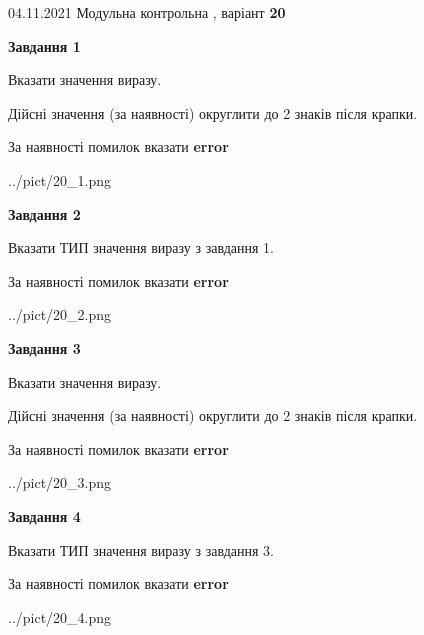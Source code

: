 \documentclass[11pt, ukrainian]{article}
\begin{document}
{04.11.2021 Модульна контрольна , варіант  \No \textbf { 20 }\par}
{
\begin {large}
{\begin {center}\textbf{Завдання 1}\end {center}}\par
Вказати значення виразу. \par
Дійсні значення (за наявності) округлити до 2 знаків після крапки. \par
За наявності помилок вказати \textbf{error}

\begin{center}
	{../pict/20_1.png}
\end{center}
\newpage

{\begin {center}\textbf{Завдання 2}\end {center}}\par
Вказати ТИП значення виразу з завдання 1. \par
За наявності помилок вказати \textbf{error}

\begin{center}
	{../pict/20_2.png}
\end{center}
\newpage

{\begin {center}\textbf{Завдання 3}\end {center}}\par
Вказати значення виразу. \par
Дійсні значення (за наявності) округлити до 2 знаків після крапки. \par
За наявності помилок вказати \textbf{error}

\begin{center}
	{../pict/20_3.png}
\end{center}
\newpage

{\begin {center}\textbf{Завдання 4}\end {center}}\par
Вказати ТИП значення виразу з завдання 3. \par
За наявності помилок вказати \textbf{error}

\begin{center}
	{../pict/20_4.png}
\end{center}
\newpage


\end{large}}
\end{document}
